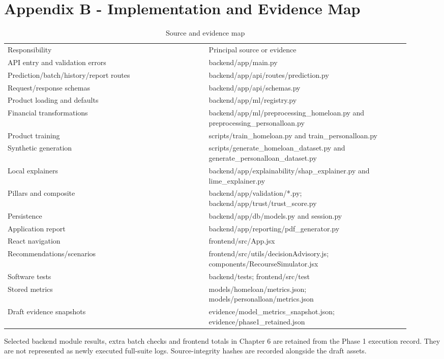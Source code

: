 \documentclass[12pt,a4paper]{report}
\begin{document}
\chapter*{Appendix B - Implementation and Evidence Map}
\begin{longtable}{p{0.46\linewidth}p{0.46\linewidth}}
\caption{Source and evidence map}\\

Responsibility & Principal source or evidence\\
API entry and validation errors & backend/app/main.py\\
Prediction/batch/history/report routes & backend/app/api/routes/prediction.py\\
Request/response schemas & backend/app/api/schemas.py\\
Product loading and defaults & backend/app/ml/registry.py\\
Financial transformations & backend/app/ml/preprocessing\_homeloan.py and preprocessing\_personalloan.py\\
Product training & scripts/train\_homeloan.py and train\_personalloan.py\\
Synthetic generation & scripts/generate\_homeloan\_dataset.py and generate\_personalloan\_dataset.py\\
Local explainers & backend/app/explainability/shap\_explainer.py and lime\_explainer.py\\
Pillars and composite & backend/app/validation/*.py; backend/app/trust/trust\_score.py\\
Persistence & backend/app/db/models.py and session.py\\
Application report & backend/app/reporting/pdf\_generator.py\\
React navigation & frontend/src/App.jsx\\
Recommendations/scenarios & frontend/src/utils/decisionAdvisory.js; components/RecourseSimulator.jsx\\
Software tests & backend/tests; frontend/src/test\\
Stored metrics & models/homeloan/metrics.json; models/personalloan/metrics.json\\
Draft evidence snapshots & evidence/model\_metrics\_snapshot.json; evidence/phase1\_retained.json\\
\end{longtable}
Selected backend module results, extra batch checks and frontend totals in Chapter 6 are retained from the Phase 1 execution record. They are not represented as newly executed full-suite logs. Source-integrity hashes are recorded alongside the draft assets.
\end{document}

